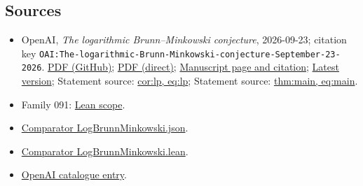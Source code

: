 \documentclass[11pt]{article}
\begin{document}
\subsection{Sources}
\begin{itemize}
\item OpenAI, \emph{The logarithmic Brunn–Minkowski conjecture}, 2026-09-23; citation key \texttt{OAI:The-logarithmic-Brunn-Minkowski-conjecture-September-23-2026}. \href{https://github.com/openai/math/blob/adc7f1241b42e322a6451854ab7e4b4c146bf78a/preprints/The-logarithmic-Brunn-Minkowski-conjecture-September-23-2026/paper.pdf}{PDF (GitHub)}; \href{https://github.com/openai/math/raw/adc7f1241b42e322a6451854ab7e4b4c146bf78a/preprints/The-logarithmic-Brunn-Minkowski-conjecture-September-23-2026/paper.pdf}{PDF (direct)}; \href{https://github.com/openai/math/blob/adc7f1241b42e322a6451854ab7e4b4c146bf78a/preprints/The-logarithmic-Brunn-Minkowski-conjecture-September-23-2026/README.md}{Manuscript page and citation}; \href{https://github.com/openai/math/blob/main/preprints/The-logarithmic-Brunn-Minkowski-conjecture-September-23-2026/paper.pdf}{Latest version}; Statement source: \href{https://github.com/openai/math/blob/adc7f1241b42e322a6451854ab7e4b4c146bf78a/preprints/The-logarithmic-Brunn-Minkowski-conjecture-September-23-2026/build/introduction.tex\#L55}{cor:lp, eq:lp}; Statement source: \href{https://github.com/openai/math/blob/adc7f1241b42e322a6451854ab7e4b4c146bf78a/preprints/The-logarithmic-Brunn-Minkowski-conjecture-September-23-2026/build/introduction.tex\#L21}{thm:main, eq:main}.
\item Family 091: \href{https://github.com/openai/math/blob/adc7f1241b42e322a6451854ab7e4b4c146bf78a/lean/docs/091.md}{Lean scope}.
\item \href{https://github.com/openai/math/blob/adc7f1241b42e322a6451854ab7e4b4c146bf78a/lean/ComparatorChallenges/LogBrunnMinkowski.json}{Comparator LogBrunnMinkowski.json}.
\item \href{https://github.com/openai/math/blob/adc7f1241b42e322a6451854ab7e4b4c146bf78a/lean/ComparatorChallenges/LogBrunnMinkowski.lean}{Comparator LogBrunnMinkowski.lean}.
\item \href{https://github.com/openai/math/blob/adc7f1241b42e322a6451854ab7e4b4c146bf78a/CONTENTS.md}{OpenAI catalogue entry}.
\end{itemize}
\end{document}
